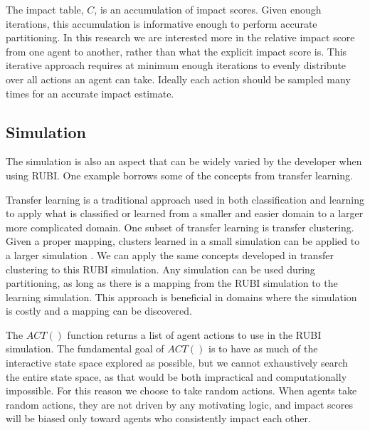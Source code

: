 \documentclass[letterpaper]{article}
\begin{document}
The impact table, $C$, is an accumulation of impact scores. Given enough iterations, this accumulation is informative enough to perform accurate partitioning. In this research we are interested more in the relative impact score from one agent to another, rather than what the explicit impact score is. This iterative approach requires at minimum enough iterations to evenly distribute over all actions an agent can take. Ideally each action should be sampled many times for an accurate impact estimate. 




\subsection{Simulation}
The simulation is also an aspect that can be widely varied by the developer when using RUBI. One example borrows some of the concepts from transfer learning.

Transfer learning is a traditional approach used in both classification and learning to apply what is classified or learned from a smaller and easier domain to a larger more complicated domain. One subset of transfer learning is transfer clustering. Given a proper mapping, clusters learned in a small simulation can be applied to a larger simulation \cite{6378284}. We can apply the same concepts developed in transfer clustering to this RUBI simulation. Any simulation can be used during partitioning, as long as there is a mapping from the RUBI simulation to the learning simulation. This approach is beneficial in domains where the simulation is costly and a mapping can be discovered. 

The $ACT()$ function returns a list of agent actions to use in the RUBI simulation. The fundamental goal of $ACT()$ is to have as much of the interactive state space explored as possible, but we cannot exhaustively search the entire state space, as that would be both impractical and computationally impossible. For this reason we choose to take random actions. When agents take random actions, they are not driven by any motivating logic, and impact scores will be biased only toward agents who consistently impact each other. 
\end{document}
